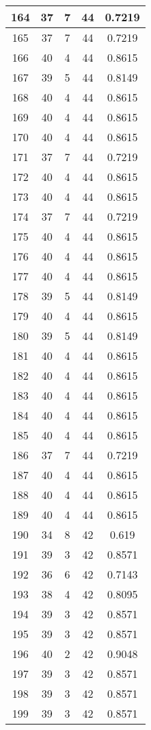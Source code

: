\documentclass[letterpaper, 12pt]{article}
\begin{document}
\begin{longtable}{|c|c|c|c|c|}
\hline
164 & 37 & 7 & 44 & 0.7219 \\
\hline
165 & 37 & 7 & 44 & 0.7219 \\
\hline
166 & 40 & 4 & 44 & 0.8615 \\
\hline
167 & 39 & 5 & 44 & 0.8149 \\
\hline
168 & 40 & 4 & 44 & 0.8615 \\
\hline
169 & 40 & 4 & 44 & 0.8615 \\
\hline
170 & 40 & 4 & 44 & 0.8615 \\
\hline
171 & 37 & 7 & 44 & 0.7219 \\
\hline
172 & 40 & 4 & 44 & 0.8615 \\
\hline
173 & 40 & 4 & 44 & 0.8615 \\
\hline
174 & 37 & 7 & 44 & 0.7219 \\
\hline
175 & 40 & 4 & 44 & 0.8615 \\
\hline
176 & 40 & 4 & 44 & 0.8615 \\
\hline
177 & 40 & 4 & 44 & 0.8615 \\
\hline
178 & 39 & 5 & 44 & 0.8149 \\
\hline
179 & 40 & 4 & 44 & 0.8615 \\
\hline
180 & 39 & 5 & 44 & 0.8149 \\
\hline
181 & 40 & 4 & 44 & 0.8615 \\
\hline
182 & 40 & 4 & 44 & 0.8615 \\
\hline
183 & 40 & 4 & 44 & 0.8615 \\
\hline
184 & 40 & 4 & 44 & 0.8615 \\
\hline
185 & 40 & 4 & 44 & 0.8615 \\
\hline
186 & 37 & 7 & 44 & 0.7219 \\
\hline
187 & 40 & 4 & 44 & 0.8615 \\
\hline
188 & 40 & 4 & 44 & 0.8615 \\
\hline
189 & 40 & 4 & 44 & 0.8615 \\
\hline
190 & 34 & 8 & 42 & 0.619 \\
\hline
191 & 39 & 3 & 42 & 0.8571 \\
\hline
192 & 36 & 6 & 42 & 0.7143 \\
\hline
193 & 38 & 4 & 42 & 0.8095 \\
\hline
194 & 39 & 3 & 42 & 0.8571 \\
\hline
195 & 39 & 3 & 42 & 0.8571 \\
\hline
196 & 40 & 2 & 42 & 0.9048 \\
\hline
197 & 39 & 3 & 42 & 0.8571 \\
\hline
198 & 39 & 3 & 42 & 0.8571 \\
\hline
199 & 39 & 3 & 42 & 0.8571 \\
\hline
\end{longtable}
\end{document}
